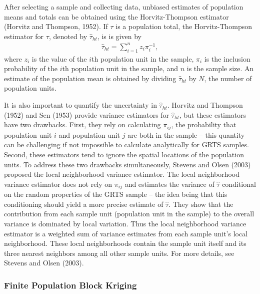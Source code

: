 \documentclass[]{elsarticle} %
\begin{document}
After selecting a sample and collecting data, unbiased estimates of
population means and totals can be obtained using the Horvitz-Thompson
estimator (Horvitz and Thompson, 1952). If \(\tau\) is a population
total, the Horvitz-Thompson estimator for \(\tau\), denoted by
\(\hat{\tau}_{ht}\), is is given by \begin{align}\label{eq:ht}
  \hat{\tau}_{ht} = \sum_{i = 1}^n z_i \pi_i^{-1},
\end{align} where \(z_i\) is the value of the \(i\)th population unit in
the sample, \(\pi_i\) is the inclusion probability of the \(i\)th
population unit in the sample, and \(n\) is the sample size. An estimate
of the population mean is obtained by dividing \(\hat{\tau}_{ht}\) by
\(N\), the number of population units.

It is also important to quantify the uncertainty in \(\hat{\tau}_{ht}\).
Horvitz and Thompson (1952) and Sen (1953) provide variance estimators
for \(\hat{\tau}_{ht}\), but these estimators have two drawbacks. First,
they rely on calculating \(\pi_{ij}\), the probability that population
unit \(i\) and population unit \(j\) are both in the sample -- this
quantity can be challenging if not impossible to calculate analytically
for GRTS samples. Second, these estimators tend to ignore the spatial
locations of the population units. To address these two drawbacks
simultaneously, Stevens and Olsen (2003) proposed the local neighborhood
variance estimator. The local neighborhood variance estimator does not
rely on \(\pi_{ij}\) and estimates the variance of \(\hat{\tau}\)
conditional on the random properties of the GRTS sample -- the idea
being that this conditioning should yield a more precise estimate of
\(\hat{\tau}\). They show that the contribution from each sample unit
(population unit in the sample) to the overall variance is dominated by
local variation. Thus the local neighborhood variance estimator is a
weighted sum of variance estimates from each sample unit's local
neighborhood. These local neighborhoods contain the sample unit itself
and its three nearest neighbors among all other sample units. For more
details, see Stevens and Olsen (2003).

\hypertarget{finite-population-block-kriging}{%
\subsubsection{Finite Population Block
Kriging}\label{finite-population-block-kriging}}
\end{document}
